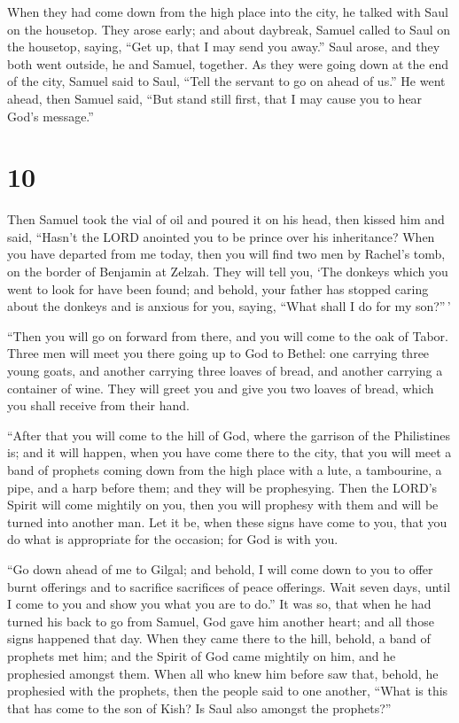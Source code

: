  When they had come down from the high place into the city,
he talked with Saul on the housetop.  They arose early; and
about daybreak, Samuel called to Saul on the housetop, saying, ``Get up,
that I may send you away.'' Saul arose, and they both went outside, he
and Samuel, together.  As they were going down at the end
of the city, Samuel said to Saul, ``Tell the servant to go on ahead of
us.'' He went ahead, then Samuel said, ``But stand still first, that I
may cause you to hear God's message.''

\hypertarget{section-9}{%
\section{10}\label{section-9}}

 Then Samuel took the vial of oil and poured it on his head,
then kissed him and said, ``Hasn't the LORD anointed you to be prince
over his inheritance?  When you have departed from me today,
then you will find two men by Rachel's tomb, on the border of Benjamin
at Zelzah. They will tell you, `The donkeys which you went to look for
have been found; and behold, your father has stopped caring about the
donkeys and is anxious for you, saying, ``What shall I do for my
son?''\,'

 ``Then you will go on forward from there, and you will come
to the oak of Tabor. Three men will meet you there going up to God to
Bethel: one carrying three young goats, and another carrying three
loaves of bread, and another carrying a container of wine. 
They will greet you and give you two loaves of bread, which you shall
receive from their hand.

 ``After that you will come to the hill of God, where the
garrison of the Philistines is; and it will happen, when you have come
there to the city, that you will meet a band of prophets coming down
from the high place with a lute, a tambourine, a pipe, and a harp before
them; and they will be prophesying.  Then the LORD's Spirit
will come mightily on you, then you will prophesy with them and will be
turned into another man.  Let it be, when these signs have
come to you, that you do what is appropriate for the occasion; for God
is with you.

 ``Go down ahead of me to Gilgal; and behold, I will come
down to you to offer burnt offerings and to sacrifice sacrifices of
peace offerings. Wait seven days, until I come to you and show you what
you are to do.''  It was so, that when he had turned his
back to go from Samuel, God gave him another heart; and all those signs
happened that day.  When they came there to the hill,
behold, a band of prophets met him; and the Spirit of God came mightily
on him, and he prophesied amongst them.  When all who knew
him before saw that, behold, he prophesied with the prophets, then the
people said to one another, ``What is this that has come to the son of
Kish? Is Saul also amongst the prophets?''

